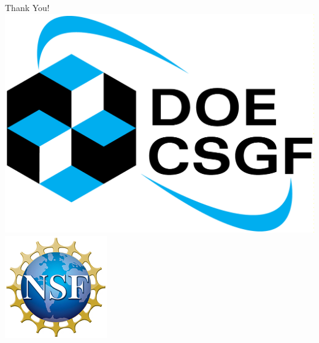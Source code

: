 \documentclass[12pt]{beamer}
\begin{document}
\begin{frame}{Thank You!}
%
\hfill
\includegraphics[height=\picheight]{CSGF_vert_1200x853}
\includegraphics[height=\picheight]{nsf_logo}

\vfill
\def\picheight{0.6in}


\end{frame}
\end{document}
